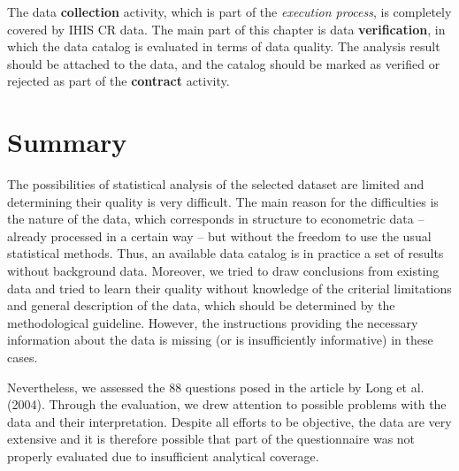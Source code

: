 The data \textbf{collection} activity, which is part of the \textit{execution process}, is completely covered by IHIS CR data.
The main part of this chapter is data \textbf{verification}, in which the data catalog is evaluated in terms of data quality.
The analysis result should be attached to the data, and the catalog should be marked as verified or rejected as part of the \textbf{contract} activity.

\section{Summary}

The possibilities of statistical analysis of the selected dataset are limited and determining their quality is very difficult.
The main reason for the difficulties is the nature of the data, which corresponds in structure to econometric data – already processed in a certain way – but without the freedom to use the usual statistical methods.
Thus, an available data catalog is in practice a set of results without background data.
Moreover, we tried to draw conclusions from existing data and tried to learn their quality without knowledge of the criterial limitations and general description of the data, which should be determined by the methodological guideline.
However, the instructions providing the necessary information about the data is missing (or is insufficiently informative) in these cases.

Nevertheless, we assessed the 88 questions posed in the article by Long et al. (2004).
Through the evaluation, we drew attention to possible problems with the data and their interpretation.
Despite all efforts to be objective, the data are very extensive and it is therefore possible that part of the questionnaire was not properly evaluated due to insufficient analytical coverage.


